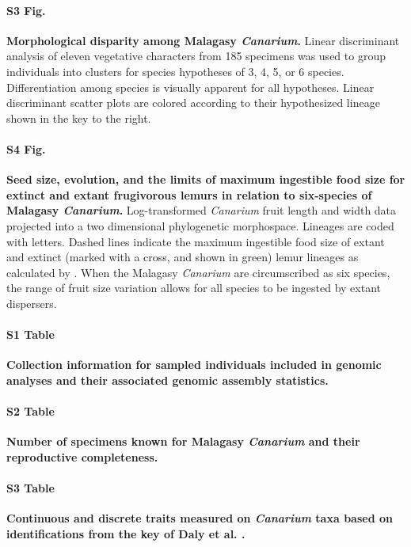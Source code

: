 \documentclass[10pt,letterpaper]{article}
\begin{document}
\paragraph*{S3 Fig.}
\label{suppfig:3}
{\bf Morphological disparity among Malagasy \emph{Canarium}.}
Linear discriminant analysis of eleven vegetative characters from 185 specimens was used to group
individuals into clusters for species hypotheses of 3, 4, 5, or 6 species.  Differentiation among
species is visually apparent for all hypotheses. Linear discriminant scatter plots are colored
according to their hypothesized lineage shown in the key to the right.

\paragraph*{S4 Fig.}
\label{suppfig:4}
{\bf Seed size, evolution, and the limits of maximum ingestible food size for extinct and extant frugivorous lemurs in relation to six-species of Malagasy \emph{Canarium}.}
Log-transformed \emph{Canarium} fruit length and width data projected into a two dimensional phylogenetic morphospace. Lineages are coded with letters. Dashed lines indicate the maximum ingestible food size of extant and extinct (marked with a cross, and shown in green) lemur lineages as calculated by \cite{federman_implications_2016}. When the Malagasy \emph{Canarium} are circumscribed as six species, the range of fruit size variation allows for all species to be ingested by extant dispersers.



\paragraph*{S1 Table}
\label{supptab:1}
{\bf Collection information for sampled individuals included in genomic analyses and their associated genomic assembly statistics.}

\paragraph*{S2 Table}
\label{supptab:2}
{\bf Number of specimens known for Malagasy \emph{Canarium} and their reproductive completeness.}

\paragraph*{S3 Table}
\label{supptab:3}
{\bf Continuous and discrete traits measured on \emph{Canarium} taxa based on identifications from the key of Daly et al. \cite{daly_revision_2015}.}
\end{document}
